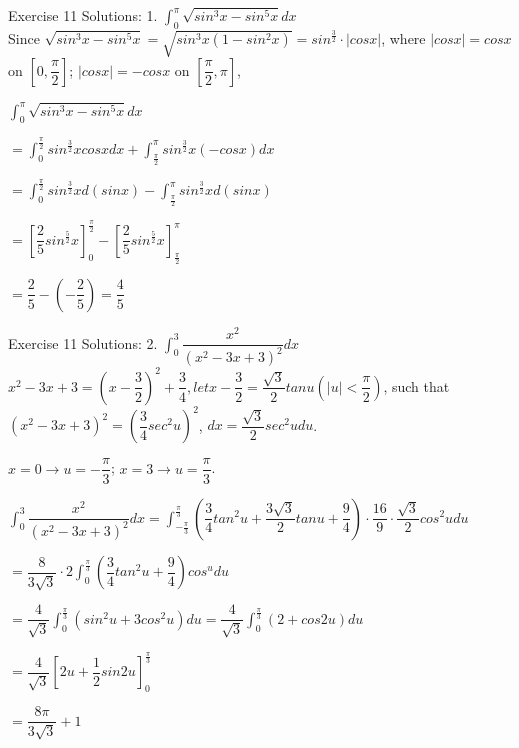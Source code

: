 \documentclass{beamer}
\begin{document}
\begin{frame}{Exercise 11}
Solutions:
1. $\int_{0}^{\pi}\sqrt{sin^3x - sin^5x}dx$
\\

Since $\sqrt{sin^3x - sin^5 x} = \sqrt{sin^3x(1-sin^2x)} = sin^{\frac{3}{2}}\cdot|cosx|$, where $|cosx| = cosx$ on $[0,\dfrac{\pi}{2}]$; $|cosx| = -cosx$ on $[\dfrac{\pi}{2}, \pi]$, 

$\int_{0}^{\pi}\sqrt{sin^3x - sin^5x}dx$

$= \int_{0}^{\frac{\pi}{2}}sin^{\frac{3}{2}}xcosxdx + \int_{\frac{\pi}{2}}^{\pi}sin^{\frac{3}{2}}x(-cosx)dx$

$= \int_{0}^{\frac{\pi}{2}}sin^{\frac{3}{2}}xd(sinx) - \int_{\frac{\pi}{2}}^{\pi}sin^{\frac{3}{2}}xd(sinx)$

$= [\dfrac{2}{5}sin^{\frac{5}{2}}x]_0^{\frac{\pi}{2}} - [\dfrac{2}{5}sin^{\frac{5}{2}}x]_{\frac{\pi}{2}}^{\pi}$

$= \dfrac{2}{5} - (-\dfrac{2}{5}) = \dfrac{4}{5}$
\end{frame}

\begin{frame}{Exercise 11}
Solutions:
2. $\int_{0}^{3}\dfrac{x^2}{(x^2 -3x +3)^2}dx$
\\

$x^2 - 3x +3 = (x - \dfrac{3}{2})^2 + \dfrac{3}{4}, let x - \dfrac{3}{2} = \dfrac{\sqrt{3}}{2}tanu (|u|<\dfrac{\pi}{2}) $, such that $(x^2 - 3x + 3)^2 = (\dfrac{3}{4}sec^2u)^2$, $dx = \dfrac{\sqrt{3}}{2}sec^2udu$.

$x = 0 \rightarrow u = -\dfrac{\pi}{3}$; $x = 3 \rightarrow u = \dfrac{\pi}{3}$.

$\int_{0}^{3}\dfrac{x^2}{(x^2 -3x +3)^2}dx = \int_{-\frac{\pi}{3}}^{\frac{\pi}{3}}(\dfrac{3}{4}tan^2u + \dfrac{3\sqrt{3}}{2}tanu + \dfrac{9}{4})\cdot \dfrac{16}{9}\cdot \dfrac{\sqrt{3}}{2}cos^2udu$

$= \dfrac{8}{3\sqrt{3}}\cdot 2 \int_{0}^{\frac{\pi}{3}}(\dfrac{3}{4}tan^2u + \dfrac{9}{4})cos^u du$

$= \dfrac{4}{\sqrt{3}}\int_{0}^{\frac{\pi}{3}}(sin^2u + 3cos^2 u)du = \dfrac{4}{\sqrt{3}}\int_{0}^{\frac{\pi}{3}}(2 + cos2u)du$

$= \dfrac{4}{\sqrt{3}} [2u + \dfrac{1}{2}sin2u]_{0}^{\frac{\pi}{3}}$

$= \dfrac{8\pi}{3\sqrt{3}} + 1$
\end{frame}
\end{document}
